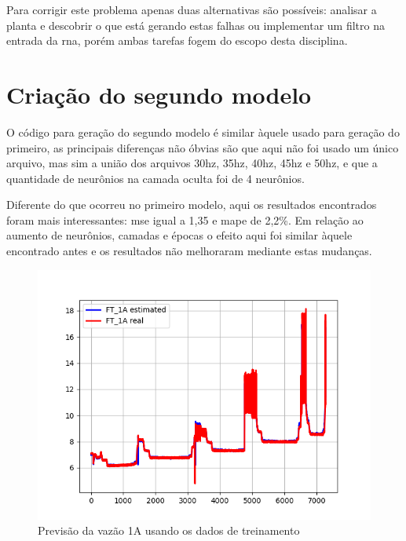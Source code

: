 \documentclass[12pt]{article}
\begin{document}
Para corrigir este problema apenas duas alternativas são possíveis: analisar a planta e descobrir o que está gerando estas falhas ou implementar um filtro na entrada da \acrshort{rna}, porém ambas tarefas fogem do escopo desta disciplina.

\section{Criação do segundo modelo}
\label{sec:modelo2}



O código para geração do segundo modelo é similar àquele usado para geração do primeiro, as principais diferenças não óbvias são que aqui não foi usado um único arquivo, mas sim a união dos arquivos 30hz, 35hz, 40hz, 45hz e 50hz, e que a quantidade de neurônios na camada oculta foi de 4 neurônios.

Diferente do que ocorreu no primeiro modelo, aqui os resultados encontrados foram mais interessantes: \acrshort{mse} igual a 1,35 e \acrshort{mape} de 2,2\%. Em relação ao aumento de neurônios, camadas e épocas o efeito aqui foi similar àquele encontrado antes e os resultados não melhoraram mediante estas mudanças.

\begin{figure}
    \centering
    \includegraphics{results/complete-training-1A.png}
    \caption{Previsão da vazão 1A usando os dados de treinamento}
    \label{fig:complete-training-1A}
\end{figure}
\end{document}
